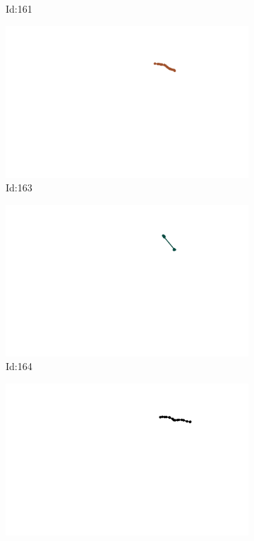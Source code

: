 \documentclass[12pt,twoside]{report}
\begin{document}
\begin{figure}
\begin{subfigure}[b]{0.20\textwidth}
\caption{Id:161}
\end{subfigure}
\begin{subfigure}[b]{0.20\textwidth}
\centering
\includegraphics[width=\textwidth]{../../trajectories/163.png}
\caption{Id:163}
\end{subfigure}
\begin{subfigure}[b]{0.20\textwidth}
\centering
\includegraphics[width=\textwidth]{../../trajectories/164.png}
\caption{Id:164}
\end{subfigure}
\begin{subfigure}[b]{0.20\textwidth}
\centering
\includegraphics[width=\textwidth]{../../trajectories/619.png}

\end{subfigure}
\end{figure}
\end{document}
